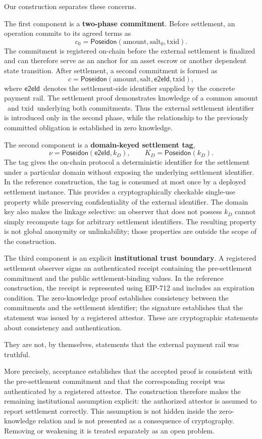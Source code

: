 \documentclass[10pt,twocolumn]{article}
\newcommand{\Poseidon}{\ensuremath{\mathsf{Poseidon}}}
\newcommand{\eeid}{\ensuremath{\mathsf{e2eId}}}
\newcommand{\amount}{\ensuremath{\text{amount}}}
\newcommand{\txid}{\ensuremath{\text{txid}}}
\newcommand{\salt}{\ensuremath{\text{salt}}}
\begin{document}
Our construction separates these concerns.

The first component is a \textbf{two-phase commitment}. Before
settlement, an operation commits to its agreed terms as
\[
c_0 = \Poseidon(\amount, \salt_0, \txid).
\]
The commitment is registered on-chain before the external settlement is
finalized and can therefore serve as an anchor for an asset escrow or
another dependent state transition. After settlement, a second commitment
is formed as
\[
c = \Poseidon(\amount, \salt, \eeid, \txid),
\]
where \eeid\ denotes the settlement-side identifier supplied by the
concrete payment rail. The settlement proof demonstrates knowledge of a
common \amount\ and \txid\ underlying both commitments. Thus the external
settlement identifier is introduced only in the second phase, while the
relationship to the previously committed obligation is established in
zero knowledge.

The second component is a \textbf{domain-keyed settlement tag},
\[
\nu = \Poseidon(\eeid, k_D), \qquad K_D = \Poseidon(k_D).
\]
The tag gives the on-chain protocol a deterministic identifier for the
settlement under a particular domain without exposing the underlying
settlement identifier. In the reference construction, the tag is consumed
at most once by a deployed settlement instance. This provides a
cryptographically checkable single-use property while preserving
confidentiality of the external identifier. The domain key also makes the
linkage selective: an observer that does not possess $k_D$ cannot simply
recompute tags for arbitrary settlement identifiers. The resulting
property is not global anonymity or unlinkability; those properties are
outside the scope of the construction.

The third component is an explicit \textbf{institutional trust boundary}.
A registered settlement observer signs an authenticated receipt
containing the pre-settlement commitment and the public settlement-binding
values. In the reference construction, the receipt is represented using
EIP-712 and includes an expiration condition. The zero-knowledge proof
establishes consistency between the commitments and the settlement
identifier; the signature establishes that the statement was issued by a
registered attestor. These are cryptographic statements about consistency
and authentication.

They are not, by themselves, statements that the external payment rail
was truthful.

More precisely, acceptance establishes that the accepted proof is
consistent with the pre-settlement commitment and that the corresponding
receipt was authenticated by a registered attestor. The construction
therefore makes the remaining institutional assumption explicit: the
authorized attestor is assumed to report settlement correctly. This
assumption is not hidden inside the zero-knowledge relation and is not
presented as a consequence of cryptography. Removing or weakening it is
treated separately as an open problem.
\end{document}
